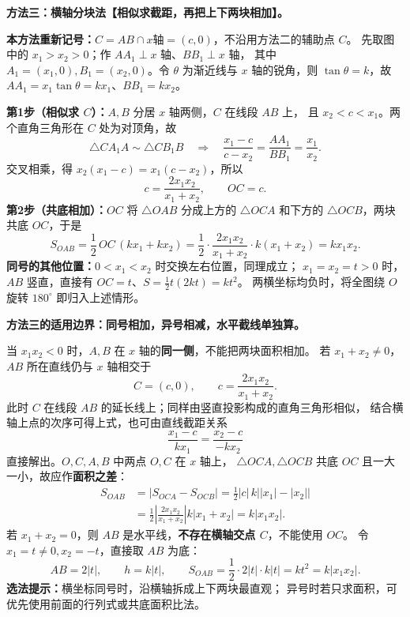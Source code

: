 \clearpage
\begin{proofbox}
\textbf{方法三：横轴分块法【相似求截距，再把上下两块相加】。}
\begin{center}\end{center}

\textbf{本方法重新记号：}$C=AB\cap x\text{轴}=(c,0)$，不沿用方法二的辅助点 $C$。
先取图中的 $x_1>x_2>0$；作 $AA_1\perp x$ 轴、$BB_1\perp x$ 轴，
其中 $A_1=(x_1,0),B_1=(x_2,0)$。令 $\theta$ 为渐近线与 $x$ 轴的锐角，则
$\tan\theta=k$，故 $AA_1=x_1\tan\theta=kx_1$、$BB_1=kx_2$。

\textbf{第1步（相似求 $C$）：}$A,B$ 分居 $x$ 轴两侧，$C$ 在线段 $AB$ 上，
且 $x_2<c<x_1$。两个直角三角形在 $C$ 处为对顶角，故
\[
\triangle CA_1A\sim\triangle CB_1B
\quad\Longrightarrow\quad
\frac{x_1-c}{c-x_2}=\frac{AA_1}{BB_1}=\frac{x_1}{x_2}.
\]
交叉相乘，得 $x_2(x_1-c)=x_1(c-x_2)$，所以
\[
\boxed{c=\frac{2x_1x_2}{x_1+x_2}},\qquad OC=c.
\]
\textbf{第2步（共底相加）：}$OC$ 将 $\triangle OAB$ 分成上方的 $\triangle OCA$
和下方的 $\triangle OCB$，两块共底 $OC$，于是
\[
S_{OAB}=\frac12\,OC\,(kx_1+kx_2)
=\frac12\cdot\frac{2x_1x_2}{x_1+x_2}\cdot k(x_1+x_2)
=\boxed{kx_1x_2}.
\]
\textbf{同号的其他位置：}$0<x_1<x_2$ 时交换左右位置，同理成立；
$x_1=x_2=t>0$ 时，$AB$ 竖直，直接有 $OC=t$、$S=\frac12t(2kt)=kt^2$。
两横坐标均负时，将全图绕 $O$ 旋转 $180^\circ$ 即归入上述情形。
\end{proofbox}
\clearpage
\begin{proofbox}
\textbf{方法三的适用边界：同号相加，异号相减，水平截线单独算。}
\begin{center}\end{center}

当 $x_1x_2<0$ 时，$A,B$ 在 $x$ 轴的\textbf{同一侧}，不能把两块面积相加。
若 $x_1+x_2\ne0$，$AB$ 所在直线仍与 $x$ 轴相交于
\[
C=(c,0),\qquad c=\frac{2x_1x_2}{x_1+x_2}.
\]
此时 $C$ 在线段 $AB$ 的延长线上；同样由竖直投影构成的直角三角形相似，
结合横轴上点的次序可得上式，也可由直线截距关系
\[
\frac{x_1-c}{kx_1}=\frac{x_2-c}{-kx_2}
\]
直接解出。$O,C,A,B$ 中两点 $O,C$ 在 $x$ 轴上，
$\triangle OCA,\triangle OCB$ 共底 $OC$ 且一大一小，故应作\textbf{面积之差}：
\[
\begin{aligned}
S_{OAB}
&=\bigl|S_{OCA}-S_{OCB}\bigr|
=\frac12|c|\,k\bigl||x_1|-|x_2|\bigr|\\
&=\frac12\left|\frac{2x_1x_2}{x_1+x_2}\right|k|x_1+x_2|
=\boxed{k|x_1x_2|}.
\end{aligned}
\]
若 $x_1+x_2=0$，则 $AB$ 是水平线，\textbf{不存在横轴交点 $C$}，不能使用 $OC$。
令 $x_1=t\ne0,x_2=-t$，直接取 $AB$ 为底：
\[
AB=2|t|,\qquad h=k|t|,\qquad
S_{OAB}=\frac12\cdot2|t|\cdot k|t|=kt^2=k|x_1x_2|.
\]
\textbf{选法提示：}横坐标同号时，沿横轴拆成上下两块最直观；
异号时若只求面积，可优先使用前面的行列式或共底面积比法。
\end{proofbox}
